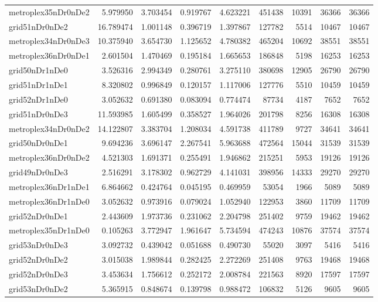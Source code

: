 \documentclass[../../../thesis.tex]{subfiles}
\begin{document}
\begin{longtable}{|l|r|r|r|r|r|r|r|r|}
metroplex35nDr0nDe2 & 5.979950 & 3.703454 & 0.919767 & 4.623221 & 451438 & 10391 & 36366 & 36366 \\
grid51nDr0nDe2 & 16.789474 & 1.001148 & 0.396719 & 1.397867 & 127782 & 5514 & 10467 & 10467 \\
metroplex34nDr0nDe3 & 10.375940 & 3.654730 & 1.125652 & 4.780382 & 465204 & 10692 & 38551 & 38551 \\
metroplex36nDr0nDe1 & 2.601504 & 1.470469 & 0.195184 & 1.665653 & 186848 & 5198 & 16253 & 16253 \\
grid50nDr1nDe0 & 3.526316 & 2.994349 & 0.280761 & 3.275110 & 380698 & 12905 & 26790 & 26790 \\
grid51nDr1nDe1 & 8.320802 & 0.996849 & 0.120157 & 1.117006 & 127776 & 5510 & 10459 & 10459 \\
grid52nDr1nDe0 & 3.052632 & 0.691380 & 0.083094 & 0.774474 & 87734 & 4187 & 7652 & 7652 \\
grid51nDr0nDe3 & 11.593985 & 1.605499 & 0.358527 & 1.964026 & 201798 & 8256 & 16308 & 16308 \\
metroplex34nDr0nDe2 & 14.122807 & 3.383704 & 1.208034 & 4.591738 & 411789 & 9727 & 34641 & 34641 \\
grid50nDr0nDe1 & 9.694236 & 3.696147 & 2.267541 & 5.963688 & 472564 & 15044 & 31539 & 31539 \\
metroplex36nDr0nDe2 & 4.521303 & 1.691371 & 0.255491 & 1.946862 & 215251 & 5953 & 19126 & 19126 \\
grid49nDr0nDe3 & 2.516291 & 3.178302 & 0.962729 & 4.141031 & 398956 & 14333 & 29270 & 29270 \\
metroplex36nDr1nDe1 & 6.864662 & 0.424764 & 0.045195 & 0.469959 & 53054 & 1966 & 5089 & 5089 \\
metroplex36nDr1nDe0 & 3.052632 & 0.973916 & 0.079024 & 1.052940 & 122953 & 3860 & 11709 & 11709 \\
grid52nDr0nDe1 & 2.443609 & 1.973736 & 0.231062 & 2.204798 & 251402 & 9759 & 19462 & 19462 \\
metroplex35nDr1nDe0 & 0.105263 & 3.772947 & 1.961647 & 5.734594 & 474243 & 10876 & 37574 & 37574 \\
grid53nDr0nDe3 & 3.092732 & 0.439042 & 0.051688 & 0.490730 & 55020 & 3097 & 5416 & 5416 \\
grid52nDr0nDe2 & 3.015038 & 1.989844 & 0.282425 & 2.272269 & 251408 & 9763 & 19468 & 19468 \\
grid52nDr0nDe3 & 3.453634 & 1.756612 & 0.252172 & 2.008784 & 221563 & 8920 & 17597 & 17597 \\
grid53nDr0nDe2 & 5.365915 & 0.848674 & 0.139798 & 0.988472 & 106832 & 5126 & 9605 & 9605 \\

\end{longtable}
\end{document}
